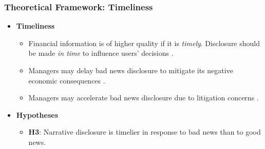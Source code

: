 \documentclass{beamer}
\begin{document}
\begin{frame}
	\frametitle{Theoretical Framework: Timeliness}
	\begin{itemize}
		\item \textbf{Timeliness}
		
		\begin{itemize}
			\item Financial information is of higher quality if it is \textit{timely}. Disclosure should be made \textit{in time} to influence users' decisions \citep{fasbConceptualFrameworkFinancial2018}.
			\item Managers may delay bad news disclosure to mitigate its negative economic consequences \citep{chambersTimelinessReportingStock1984, niessnerStrategicDisclosureTiming2015, segalAreManagersStrategic2016, brockbankStrategicTiming8K2018}.
			\item Managers may accelerate bad news disclosure due to litigation concerns \citep{skinnerWhyFirmsVoluntarily1994, marinovicNoNewsGood2016}.
		\end{itemize}
		
		\item \textbf{Hypotheses}
		
		\begin{itemize}
			\item  \textbf{H3}: Narrative disclosure is timelier in response to bad news than to good news.
		\end{itemize}
		
	\end{itemize}
\end{frame}
%
%
%
%
\end{document}
